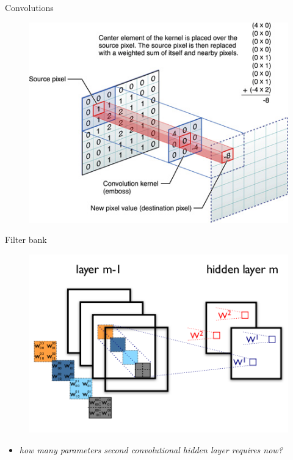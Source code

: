 \documentclass{beamer}
\begin{document}
\begin{frame}{Convolutions}

\begin{figure}[h!]
  \centering
  \includegraphics[width=1\textwidth]{images/kernel_convolution.jpg}
\end{figure}

\end{frame}


\begin{frame}{Filter bank}

\begin{figure}[h!]
  \centering
  \includegraphics[width=1\textwidth]{images/cnn_explained.png}
\end{figure}

\begin{itemize}
\item \textit{how many parameters second convolutional hidden layer requires now?}
\end{itemize}

\end{frame}
\end{document}
